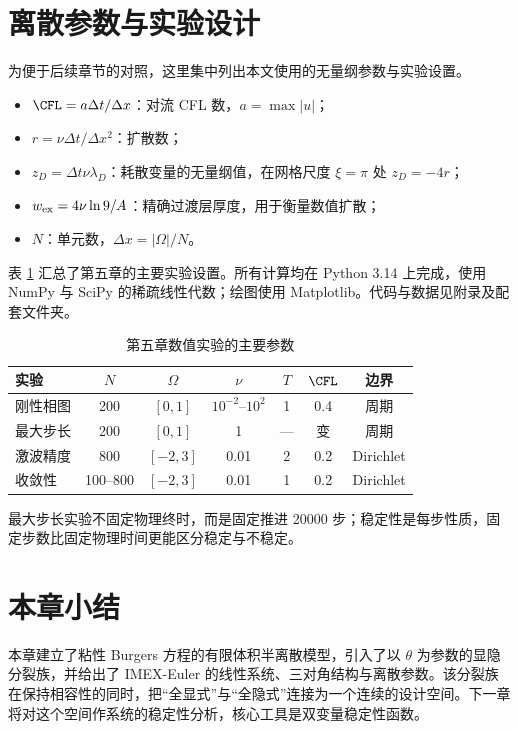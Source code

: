 \section{离散参数与实验设计}
\label{sec:parameters}

为便于后续章节的对照，这里集中列出本文使用的无量纲参数与实验设置。

\begin{itemize}[leftmargin=2.2em]
  \item $\CFL=a\Delta t/\Delta x$：对流 CFL 数，$a=\max|u|$；
  \item $r=\nu\Delta t/\Delta x^2$：扩散数；
  \item $z_D=\Delta t\nu\lambda_D$：耗散变量的无量纲值，在网格尺度 $\xi=\pi$ 处 $z_D=-4r$；
  \item $w_{\rm ex}=4\nu\ln9/A$：精确过渡层厚度，用于衡量数值扩散；
  \item $N$：单元数，$\Delta x=|\Omega|/N$。
\end{itemize}

表 \ref{tab:experiment-setup} 汇总了第五章的主要实验设置。所有计算均在 Python 3.14 上完成，使用 NumPy 与 SciPy 的稀疏线性代数；绘图使用 Matplotlib。代码与数据见附录及配套文件夹。

\begin{table}[H]
  \centering
  \caption{第五章数值实验的主要参数}
  \label{tab:experiment-setup}
  \begin{tabular}{lcccccc}
    \toprule
    实验 & $N$ & $\Omega$ & $\nu$ & $T$ & $\CFL$ & 边界 \\
    \midrule
    刚性相图 & 200 & $[0,1]$ & $10^{-2}$--$10^{2}$ & 1 & 0.4 & 周期 \\
    最大步长 & 200 & $[0,1]$ & 1 & --- & 变 & 周期 \\
    激波精度 & 800 & $[-2,3]$ & 0.01 & 2 & 0.2 & Dirichlet \\
    收敛性 & 100--800 & $[-2,3]$ & 0.01 & 1 & 0.2 & Dirichlet \\
    \bottomrule
  \end{tabular}
\end{table}

最大步长实验不固定物理终时，而是固定推进 20000 步；稳定性是每步性质，固定步数比固定物理时间更能区分稳定与不稳定。

\section{本章小结}

本章建立了粘性 Burgers 方程的有限体积半离散模型，引入了以 $\theta$ 为参数的显隐分裂族，并给出了 IMEX-Euler 的线性系统、三对角结构与离散参数。该分裂族在保持相容性的同时，把“全显式”与“全隐式”连接为一个连续的设计空间。下一章将对这个空间作系统的稳定性分析，核心工具是双变量稳定性函数。
